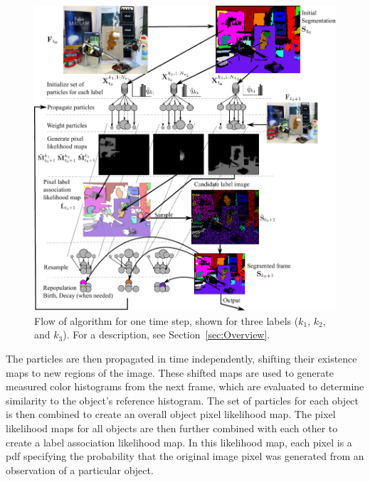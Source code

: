 \begin{figure}
\includegraphics[width=\linewidth]{figures/ECCV2012/AlgorithmFlow2.pdf}
  \caption[Overview of Algorithm]{Flow of algorithm for one time step, shown for three labels ($k_1$, $k_2$, and $k_3$). For a description, see Section~\ref{sec:Overview}.}
\label{fig:AlgorithmFlow}
\end{figure}

The particles are then propagated in time independently, shifting their existence maps to new regions of the image. These shifted maps are used to generate measured color histograms from the next frame, which are evaluated to determine similarity to the object's reference histogram. The set of particles for each object is then combined to create an overall object pixel likelihood map. The pixel likelihood maps for all objects are then further combined with each other to create a label association likelihood map. In this likelihood map, each pixel is a \gls{pdf} specifying the probability that the original image pixel was generated from an observation of a particular object.

